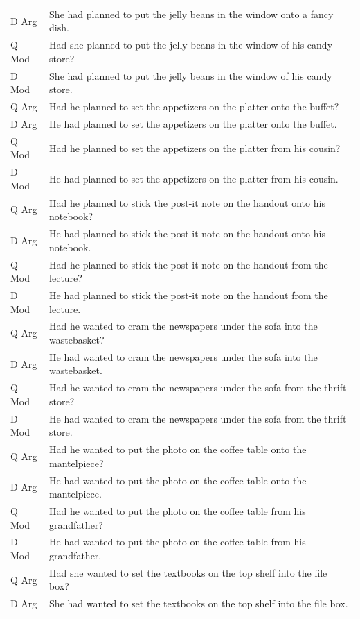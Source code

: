 \documentclass[11pt,oneside]{book}
\begin{document}
\begin{longtable}{ll}
D Arg & She had planned to put the jelly beans in the window onto a fancy dish.\\
Q Mod & Had she planned to put the jelly beans in the window of his candy store?\\
D Mod & She had planned to put the jelly beans in the window of his candy store.\\
\addlinespace
Q Arg & Had he planned to set the appetizers on the platter onto the buffet?\\
D Arg & He had planned to set the appetizers on the platter onto the buffet.\\
Q Mod & Had he planned to set the appetizers on the platter from his cousin?\\
D Mod & He had planned to set the appetizers on the platter from his cousin.\\
\addlinespace
Q Arg & Had he planned to stick the post-it note on the handout onto his notebook?\\
D Arg & He had planned to stick the post-it note on the handout onto his notebook.\\
Q Mod & Had he planned to stick the post-it note on the handout from the lecture?\\
D Mod & He had planned to stick the post-it note on the handout from the lecture.\\
\addlinespace
Q Arg & Had he wanted to cram the newspapers under the sofa into the wastebasket?\\
D Arg & He had wanted to cram the newspapers under the sofa into the wastebasket.\\
Q Mod & Had he wanted to cram the newspapers under the sofa from the thrift store?\\
D Mod & He had wanted to cram the newspapers under the sofa from the thrift store.\\
\addlinespace
Q Arg & Had he wanted to put the photo on the coffee table onto the mantelpiece?\\
D Arg & He had wanted to put the photo on the coffee table onto the mantelpiece.\\
Q Mod & Had he wanted to put the photo on the coffee table from his grandfather?\\
D Mod & He had wanted to put the photo on the coffee table from his grandfather.\\
\addlinespace
Q Arg & Had she wanted to set the textbooks on the top shelf into the file box?\\
D Arg & She had wanted to set the textbooks on the top shelf into the file box.\\

\end{longtable}
\end{document}
